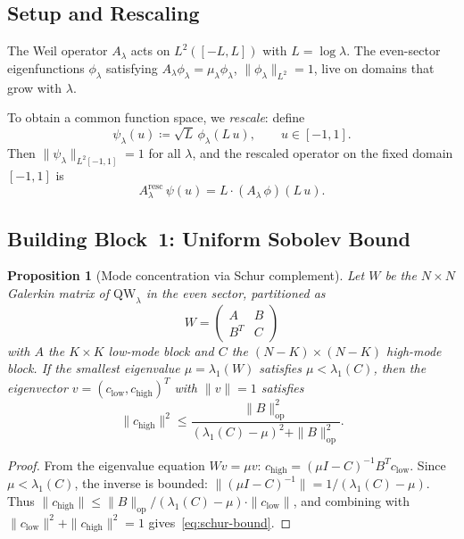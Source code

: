 \documentclass[12pt,a4paper]{article}
\newtheorem{proposition}[theorem]{Proposition}
\theoremstyle{definition}
\theoremstyle{remark}
\begin{document}
\subsection{Setup and Rescaling}

The Weil operator $A_\lambda$ acts on $L^2([-L, L])$ with $L = \log\lambda$. The even-sector eigenfunctions $\phi_\lambda$ satisfying $A_\lambda \phi_\lambda = \mu_\lambda \phi_\lambda$, $\|\phi_\lambda\|_{L^2} = 1$, live on domains that grow with $\lambda$.

To obtain a common function space, we \emph{rescale}: define
\begin{equation}
\label{eq:rescaled}
\psi_\lambda(u) \coloneqq \sqrt{L}\,\phi_\lambda(L\,u), \qquad u \in [-1,1].
\end{equation}
Then $\|\psi_\lambda\|_{L^2[-1,1]} = 1$ for all $\lambda$, and the rescaled operator on the fixed domain $[-1,1]$ is
\[
  A_\lambda^{\mathrm{resc}}\,\psi(u) = L \cdot (A_\lambda\,\phi)(L\,u).
\]

\subsection{Building Block~1: Uniform Sobolev Bound}

\begin{proposition}[Mode concentration via Schur complement]
\label{prop:mode-concentration}
Let $W$ be the $N \times N$ Galerkin matrix of $\mathrm{QW}_\lambda$ in the even sector, partitioned as
\[
  W = \begin{pmatrix} A & B \\ B^T & C \end{pmatrix}
\]
with $A$ the $K \times K$ low-mode block and $C$ the $(N-K) \times (N-K)$ high-mode block. If the smallest eigenvalue $\mu = \lambda_1(W)$ satisfies $\mu < \lambda_1(C)$, then the eigenvector $v = (c_{\mathrm{low}}, c_{\mathrm{high}})^T$ with $\|v\| = 1$ satisfies
\begin{equation}
\label{eq:schur-bound}
  \|c_{\mathrm{high}}\|^2 \leq \frac{\|B\|_{\mathrm{op}}^2}{(\lambda_1(C) - \mu)^2 + \|B\|_{\mathrm{op}}^2}.
\end{equation}
\end{proposition}

\begin{proof}
From the eigenvalue equation $Wv = \mu v$:
$c_{\mathrm{high}} = (\mu I - C)^{-1} B^T c_{\mathrm{low}}$.
Since $\mu < \lambda_1(C)$, the inverse is bounded: $\|(\mu I - C)^{-1}\| = 1/(\lambda_1(C) - \mu)$.
Thus $\|c_{\mathrm{high}}\| \leq \|B\|_{\mathrm{op}} / (\lambda_1(C) - \mu) \cdot \|c_{\mathrm{low}}\|$,
and combining with $\|c_{\mathrm{low}}\|^2 + \|c_{\mathrm{high}}\|^2 = 1$ gives~\eqref{eq:schur-bound}.
\end{proof}
\end{document}

